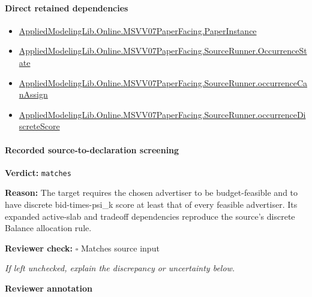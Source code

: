 \documentclass[10pt]{article}
\newcommand{\reviewerbox}{%
  \par\noindent\fbox{\parbox{0.96\linewidth}{\rule{0pt}{0.38in}}}\par
}
\newcommand{\reviewmatch}[1]{%
  \par\noindent\textbf{Reviewer check:} $\square$\; #1\par
  \noindent\emph{If left unchecked, explain the discrepancy or uncertainty below.}\par
}
\begin{document}
\paragraph{Direct retained dependencies}
\begin{itemize}\raggedright
\item \hyperlink{governing-declaration-11907576ec71eeb5}{Applied\allowbreak{}Modeling\allowbreak{}Lib.\allowbreak{}Online.\allowbreak{}MSVV07\allowbreak{}Paper\allowbreak{}Facing.\allowbreak{}Paper\allowbreak{}Instance}
\item \hyperlink{governing-declaration-2eff7815f49c1d41}{Applied\allowbreak{}Modeling\allowbreak{}Lib.\allowbreak{}Online.\allowbreak{}MSVV07\allowbreak{}Paper\allowbreak{}Facing.\allowbreak{}Source\allowbreak{}Runner.\allowbreak{}Occurrence\allowbreak{}State}
\item \hyperlink{governing-declaration-54a700f2397309bc}{Applied\allowbreak{}Modeling\allowbreak{}Lib.\allowbreak{}Online.\allowbreak{}MSVV07\allowbreak{}Paper\allowbreak{}Facing.\allowbreak{}Source\allowbreak{}Runner.\allowbreak{}occurrence\allowbreak{}Can\allowbreak{}Assign}
\item \hyperlink{governing-declaration-2d753caf9af38bde}{Applied\allowbreak{}Modeling\allowbreak{}Lib.\allowbreak{}Online.\allowbreak{}MSVV07\allowbreak{}Paper\allowbreak{}Facing.\allowbreak{}Source\allowbreak{}Runner.\allowbreak{}occurrence\allowbreak{}Discrete\allowbreak{}Score}
\end{itemize}
\paragraph{Recorded source-to-declaration screening}
\textbf{Verdict:} \texttt{matches}
\\
{\raggedright
\textbf{Reason:} The target requires the chosen advertiser to be budget-\allowbreak{}feasible and to have discrete bid-\allowbreak{}times-\allowbreak{}psi\_\allowbreak{}k score at least that of every feasible advertiser.\allowbreak{} Its expanded active-\allowbreak{}slab and tradeoff dependencies reproduce the source's discrete Balance allocation rule.\allowbreak{}
\par}
\reviewmatch{Matches source input}
\noindent\textbf{Reviewer annotation}\par
\reviewerbox
\clearpage
\hypertarget{paper-prerequisite-2cdff4edd7dcdee0}{}
\end{document}
